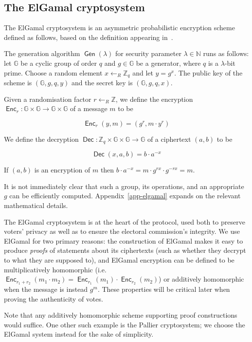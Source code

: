 \documentclass[12pt,a4paper]{article}
\DeclareMathOperator{\Gen}{\mathsf{Gen}}
\DeclareMathOperator{\Enc}{\mathsf{Enc}}
\DeclareMathOperator{\Dec}{\mathsf{Dec}}
\theoremstyle{definition}
\begin{document}
\subsection{The ElGamal cryptosystem}
The ElGamal cryptosystem is an asymmetric probabilistic encryption scheme defined as follows, based on the definition appearing in~\cite{katz2014introduction}.
\begin{definition}\label{def-elgamal}
    The generation algorithm $\Gen(\lambda)$ for security parameter $\lambda\in\mathbb{N}$ runs as follows: let $\mathbb{G}$ be a cyclic group of order $q$ and $g\in\mathbb{G}$ be a generator, where $q$ is a $\lambda$-bit prime. Choose a random element $x\gets_R\mathbb{Z}_q$ and let $y=g^x$. The public key of the scheme is $(\mathbb{G}, g, q, y)$ and the secret key is $(\mathbb{G}, g, q, x)$.

    Given a randomisation factor $r\gets_R\mathbb{Z}$, we define the encryption $\Enc_r:\mathbb{G}\times\mathbb{G}\rightarrow\mathbb{G}\times\mathbb{G}$ of a message $m$ to be
    
    $$\Enc_r(y, m) = (g^r, m\cdot y^r)$$

    We define the decryption $\Dec:\mathbb{Z}_q\times\mathbb{G}\times\mathbb{G}\rightarrow \mathbb{G}$ of a ciphertext $(a, b)$ to be
    
    $$\Dec(x, a, b)=b\cdot a^{-x}$$

    If $(a, b)$ is an encryption of $m$ then $b\cdot a^{-x}=m\cdot g^{rx}\cdot g^{-rx}=m$.
\end{definition}
It is not immediately clear that such a group, its operations, and an appropriate $g$ can be efficiently computed. Appendix~\ref{app-elgamal} expands on the relevant mathematical details.

The ElGamal cryptosystem is at the heart of the protocol, used both to preserve voters' privacy as well as to ensure the electoral commission's integrity. We use ElGamal for two primary reasons: the construction of ElGamal makes it easy to produce \textit{proofs} of statements about its ciphertexts (such as whether they decrypt to what they are supposed to), and ElGamal encryption can be defined to be multiplicatively homomorphic (i.e. $\Enc_{r_1+r_2}(m_1\cdot m_2)=\Enc_{r_1}(m_1)\cdot\Enc_{r_2}(m_2)$) or additively homomorphic when the message is instead $g^m$. These properties will be critical later when proving the authenticity of votes.

Note that any additively homomorphic scheme supporting proof constructions would suffice. One other such example is the Pallier cryptosystem; we choose the ElGamal system instead for the sake of simplicity.
\end{document}
